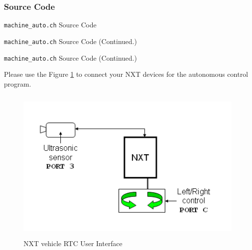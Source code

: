 \documentclass[11pt]{article}
\begin{document}
\subsubsection*{Source Code}

\begin{Program}[H]
    {\small}
    \caption{\texttt{machine\_auto.ch} Source Code\label{prog_machine_auto.ch}}
\end{Program}
\addtocounter{Program}{-1}
\begin{Program}[H]
    {\small}
    \caption{\texttt{machine\_auto.ch} Source Code (Continued.)\label{prog_machine_auto.ch}}
\end{Program}
\addtocounter{Program}{-1}
\begin{Program}[H]
    {\small}
    \caption{\texttt{machine\_auto.ch} Source Code (Continued.)\label{prog_machine_auto.ch}}
\end{Program}

Please use the Figure \ref{fig_NXT_machauto_port} to connect your NXT devices for the autonomous
control program.

\begin{figure}[h!]
    \begin{center}
    \includegraphics[height=3in]{figure/mindstorm/NXT_machauto_port.png}
    \caption{NXT vehicle RTC User Interface \label{fig_NXT_machauto_port}}
\end{center}
\end{figure}
\end{document}
